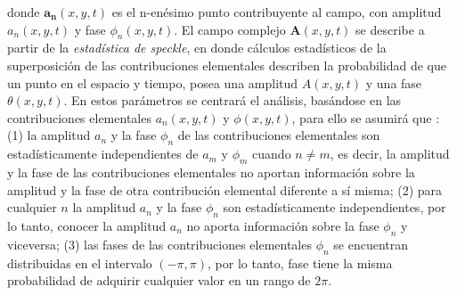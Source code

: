 
\noindent donde $\boldsymbol{a_n}(x,y,t)$ es el n-enésimo punto contribuyente al campo, con amplitud $a_n(x,y,t)$ y fase $\phi_n(x,y,t)$. El campo complejo $\boldsymbol{A}(x,y,t)$ se describe a partir de la \textit{estadística de speckle}, en donde cálculos estadísticos de la superposición de las contribuciones elementales describen la probabilidad de que un punto en el espacio y tiempo, posea una amplitud $A(x,y,t)$ y una fase $\theta(x,y,t)$. En estos parámetros se centrará el análisis, basándose en las contribuciones elementales $a_n(x,y,t)$ y $\phi(x,y,t)$, para ello se asumirá que \cite{Goodman2010}: (1) la amplitud $a_n$ y la fase $\phi_n$ de las contribuciones elementales son estadísticamente independientes de $a_m$ y $\phi_m$ cuando $n\neq m$, es decir, la amplitud y la fase de las contribuciones elementales no aportan información sobre la amplitud y la fase de otra contribución elemental diferente a sí misma; (2) para cualquier $n$ la amplitud $a_n$ y la fase $\phi_n$ son estadísticamente independientes, por lo tanto, conocer la amplitud $a_n$ no aporta información sobre la fase $\phi_n$ y viceversa; (3) las fases de las contribuciones elementales $\phi_n$ se encuentran distribuidas en el intervalo $(-\pi, \pi)$, por lo tanto, fase tiene la misma probabilidad de adquirir cualquier valor en un rango de $2\pi$.

